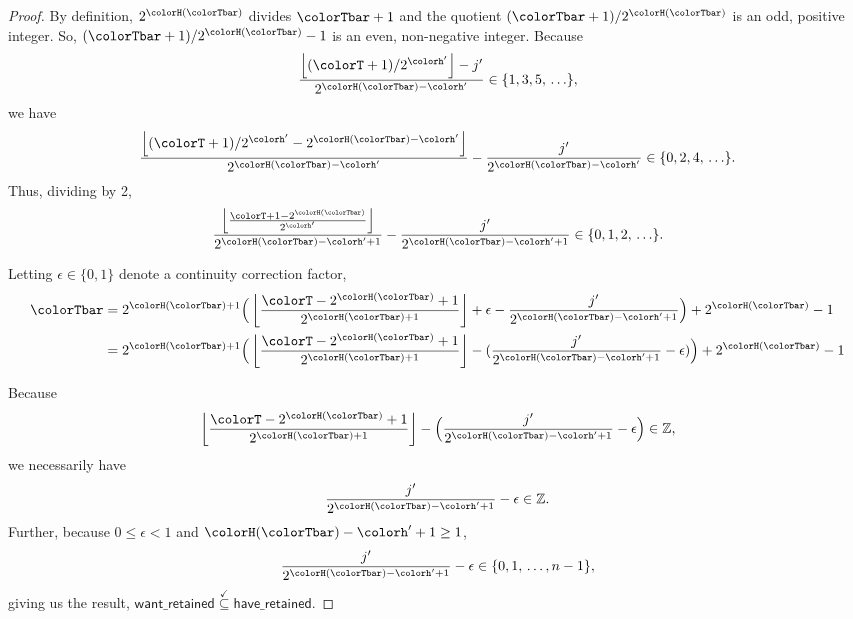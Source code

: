 \begin{proof}
By definition, $2^{\colorH(\colorTbar)}$ divides $\colorTbar + 1$ and the quotient $(\colorTbar + 1) / 2^{\colorH(\colorTbar)}$ is an odd, positive integer.
So, $(\colorTbar + 1) / 2^{\colorH(\colorTbar)} - 1$ is an even, non-negative integer.
Because
\begin{align*}
\frac{\left\lfloor (\colorT + 1) / 2^{\colorh'} \right\rfloor - j'}{2^{\colorH(\colorTbar) - \colorh'}} \in \{1, 3, 5, \, \ldots\},
\end{align*}
we have
\begin{align*}
\frac{\left\lfloor (\colorT + 1) / 2^{\colorh'} - 2^{\colorH(\colorTbar) - \colorh'} \right\rfloor}{2^{\colorH(\colorTbar) - \colorh'}}
- \frac{j'}{2^{\colorH(\colorTbar) - \colorh'}} \in \{0, 2, 4, \, \ldots\}.
\end{align*}
Thus, dividing by 2,
\begin{align*}
\frac{
  \left\lfloor
  \frac{\colorT + 1 - 2^{\colorH(\colorTbar)}}{2^{\colorh'}}
  \right\rfloor
}{
  2^{\colorH(\colorTbar) - \colorh' + 1}
}
- \frac{j'}{
  2^{\colorH(\colorTbar) - \colorh' + 1}
}
\in \{0,1,2,\,\ldots\}.
\end{align*}

Letting $\epsilon \in \{0, 1\}$ denote a continuity correction factor,
\begin{align*}
\colorTbar
&= 2^{\colorH(\colorTbar) + 1}
\Big(
\left\lfloor
\frac{
  \colorT - 2^{\colorH(\colorTbar)} + 1
}{
  2^{\colorH(\colorTbar) + 1}
}
\right\rfloor
+ \epsilon
- \frac{j'}{2^{\colorH(\colorTbar) - \colorh' + 1}}
\Big)
+ 2^{\colorH(\colorTbar)}
- 1\\
&= 2^{\colorH(\colorTbar) + 1}
\Big(
\left\lfloor
\frac{
  \colorT - 2^{\colorH(\colorTbar)} + 1
}{
  2^{\colorH(\colorTbar) + 1}
}
\right\rfloor
- (
  \frac{j'}{2^{\colorH(\colorTbar) - \colorh' + 1}}
  - \epsilon
)
\Big)
+ 2^{\colorH(\colorTbar)}
- 1\\
\end{align*}

Because
\begin{align*}
\left\lfloor
\frac{
  \colorT - 2^{\colorH(\colorTbar)} + 1
}{
  2^{\colorH(\colorTbar) + 1}
}
\right\rfloor
- \Big(
\frac{j'}{2^{\colorH(\colorTbar) - \colorh' + 1}}
- \epsilon
\Big)
\in \mathbb{Z},
\end{align*}
we necessarily have
\begin{align*}
\frac{j'}{2^{\colorH(\colorTbar) - \colorh' + 1}}
- \epsilon
\in \mathbb{Z}.
\end{align*}
Further, because $0 \leq \epsilon < 1$ and $\colorH(\colorTbar) - \colorh'  + 1 \geq 1$,
\begin{align*}
\frac{j'}{2^{\colorH(\colorTbar) - \colorh' + 1}}
- \epsilon
\in
\{0, 1, \,\ldots, n - 1\},
\end{align*}
giving us the result, $\mathsf{want\_retained} \stackrel{\checkmark}{\subseteq} \mathsf{have\_retained}$.
\end{proof}
